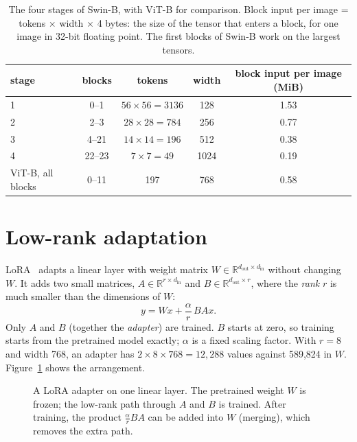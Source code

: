 \begin{table}[H]
\centering\small
\begin{tabular}{lcccc}
\toprule
stage & blocks & tokens & width & block input per image (MiB) \\
\midrule
1 & 0--1 & $56\times56 = 3136$ & 128 & 1.53 \\
2 & 2--3 & $28\times28 = 784$ & 256 & 0.77 \\
3 & 4--21 & $14\times14 = 196$ & 512 & 0.38 \\
4 & 22--23 & $7\times7 = 49$ & 1024 & 0.19 \\
\midrule
ViT-B, all blocks & 0--11 & 197 & 768 & 0.58 \\
\bottomrule
\end{tabular}
\caption{The four stages of Swin-B, with ViT-B for comparison. Block input per image = tokens $\times$ width
$\times$ 4 bytes: the size of the tensor that enters a block, for one image in 32-bit floating point. The first
blocks of Swin-B work on the largest tensors.}
\label{tab:swin_stages}
\end{table}

\section{Low-rank adaptation}

LoRA~\cite{hu2022lora} adapts a linear layer with weight matrix $W \in \mathbb{R}^{d_\text{out}\times d_\text{in}}$
without changing $W$. It adds two small matrices, $A \in \mathbb{R}^{r\times d_\text{in}}$ and
$B \in \mathbb{R}^{d_\text{out}\times r}$, where the \emph{rank} $r$ is much smaller than the dimensions of $W$:
\begin{equation}
  y = Wx + \frac{\alpha}{r}\,B A x .
  \label{eq:lora}
\end{equation}
Only $A$ and $B$ (together the \emph{adapter}) are trained. $B$ starts at zero, so training starts from the
pretrained model exactly; $\alpha$ is a fixed scaling factor. With $r=8$ and width 768, an adapter has
$2 \times 8 \times 768 = 12{,}288$ values against 589,824 in $W$. Figure~\ref{fig:lora} shows the arrangement.

\begin{figure}[H]
\centering

\caption{A LoRA adapter on one linear layer. The pretrained weight $W$ is frozen; the low-rank path through $A$ and
$B$ is trained. After training, the product $\frac{\alpha}{r}BA$ can be added into $W$ (merging), which removes
the extra path.}
\label{fig:lora}
\end{figure}

